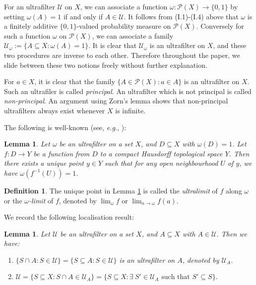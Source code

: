 \documentclass[12pt, a4paper]{amsart}
\numberwithin{equation}{section}
\newtheorem{lem}[thm]{Lemma}
\theoremstyle{definition}
\newtheorem{defn}[thm]{Definition}
\theoremstyle{remark}
\def\U{\mathcal{U}}
\def\P{\mathcal{P}}
\begin{document}
For an ultrafilter $\U$ on $X$, we can associate a function $\omega: \P(X) \to \{0,1\}$ by setting $\omega(A) =1$ if and only if $A \in \U$. It follows from (I.1)-(I.4) above that $\omega$ is a finitely additive $\{0,1\}$-valued probability measure on $\P(X)$. Conversely for such a function $\omega$ on $\P(X)$, we can associate a family $\U_\omega:=\{A \subseteq X: \omega(A)=1\}$. It is clear that $\U_\omega$ is an ultrafilter on $X$, and these two procedures are inverse to each other. Therefore throughout the paper, we slide between these two notions freely without further explanation.


For $a \in X$, it is clear that the family $\{A \in \P(X): a\in A\}$ is an ultrafilter on $X$. Such an ultrafiler is called \emph{principal}. An ultrafilter which is not principal is called \emph{non-principal}. An argument using Zorn’s lemma shows that non-principal ultrafilters always exist whenever $X$ is infinite.

The following is well-known (see, \emph{e.g.}, \cite[Lemma A.2]{SW17}):

\begin{lem}\label{lem:ultralimit}
Let $\omega$ be an ultrafilter on a set $X$, and $D \subseteq X$ with $\omega(D)=1$. Let $f: D \to Y$ be a function from $D$ to a compact Hausdorff topological space $Y$. Then there exists a unique point $y\in Y$ such that for any open neighbourhood $U$ of $y$, we have $\omega(f^{-1}(U))=1$. 
\end{lem}

\begin{defn}\label{defn:ultralimit}
The unique point in Lemma \ref{lem:ultralimit} is called the \emph{ultralimit} of $f$ along $\omega$ or the \emph{$\omega$-limit} of $f$, denoted by $\lim_\omega f$ or $\lim_{a\to \omega} f(a)$. 
\end{defn}


We record the following localisation result:

\begin{lem}\label{lem:localisation ultrafilter}
Let $\U$ be an ultrafilter on a set $X$, and $A \subseteq X$ with $A \in \U$. Then we have:
\begin{enumerate}
 \item $\{S \cap A: S \in \U\} = \{S \subseteq A: S \in \U\}$ is an ultrafilter on $A$, denoted by $\U_A$.
 \item $\U=\{S \subseteq X: S \cap A \in \U_A\} = \{S \subseteq X: \exists~ S' \in \U_A \text{ such that } S' \subseteq S\}$.
\end{enumerate}
\end{lem}
\end{document}
